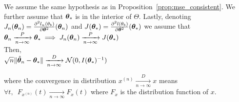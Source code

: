 \begin{proposition}
  \label{prop:asymp:norm}
  We assume the same hypothesis as in Proposition~\ref{prop:mse_consistent}.
  We further assume that $\thetab_*$ is in the interior of $\Theta$.
  Lastly, denoting $J_n(\thetab_n) =
  \partialfrac{\thetab^2}{^2l_n(\theta_b)}(\thetab_n)$ and $J(\thetab_*) =
  \partialfrac{\thetab^2}{^2l(\theta_b)}(\thetab_*)$ we assume that \\
  $\thetab_n \xrightarrow[n \rightarrow
  \infty]{P} \thetab_* \implies J_n(\thetab_n) \xrightarrow[n \rightarrow
  \infty]{P} J(\thetab_*)$\\
  Then, \\
  $\sqrt{n} \| \hat{\thetab}_n - \thetab_* \| \xrightarrow[n \rightarrow
  \infty]{D}  \Ncal(0,
  I(\thetab_*)^{-1})$
\end{proposition}
where the convergence in distribution $ x^{(n)} \xrightarrow[n \rightarrow \infty]{D} x$ means  $\forall t, \enspace F_{x^{(n)}}(t)
\xrightarrow[n \rightarrow \infty]{} F_x(t)$ where $F_x$ is the distribution
function of $x$.
